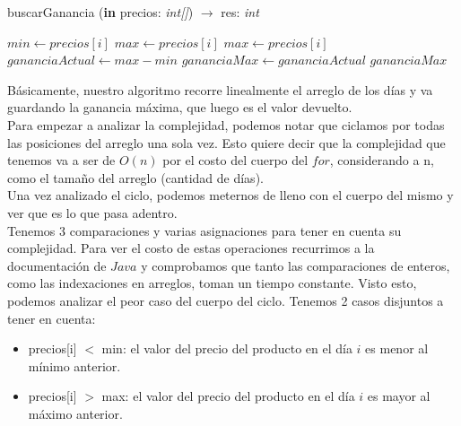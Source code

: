 \begin{algorithm}
\caption{buscarGanancia (\textbf{in} precios: \textsl{int[]}) $\rightarrow$ res: \textsl{int}}
\begin{algorithmic}[1]

		\STATE $min \leftarrow precios[i]$
		\STATE $max \leftarrow precios[i]$
	\ENDIF
		\STATE $max \leftarrow precios[i]$
	\ENDIF	
	\STATE $gananciaActual \leftarrow max - min$
		\STATE $gananciaMax \leftarrow gananciaActual$
	\ENDIF
\ENDFOR
\RETURN $gananciaMax$
\end{algorithmic}
\end{algorithm}

\indent Básicamente, nuestro algoritmo recorre linealmente el arreglo de los días y va guardando la ganancia máxima, que luego es el valor devuelto.\\
\indent Para empezar a analizar la complejidad, podemos notar que ciclamos por todas las posiciones del arreglo una sola vez. Esto quiere decir que la complejidad que tenemos va a ser de $O(n)$ por el costo del cuerpo del $for$, considerando a n, como el tamaño del arreglo (cantidad de días).\\
\indent Una vez analizado el ciclo, podemos meternos de lleno con el cuerpo del mismo y ver que es lo que pasa adentro.\\
\indent Tenemos 3 comparaciones y varias asignaciones para tener en cuenta su complejidad. Para ver el costo de estas operaciones recurrimos a la documentación de $Java$ y comprobamos que tanto las comparaciones de enteros, como las indexaciones en arreglos, toman un tiempo constante. Visto esto, podemos analizar el peor caso del cuerpo del ciclo. Tenemos 2 casos disjuntos a tener en cuenta:

\begin{itemize}
 \item precios[i] $<$ min: el valor del precio del producto en el día $i$ es menor al mínimo anterior.
 \item precios[i] $>$ max: el valor del precio del producto en el día $i$ es mayor al máximo anterior.
\end{itemize}

